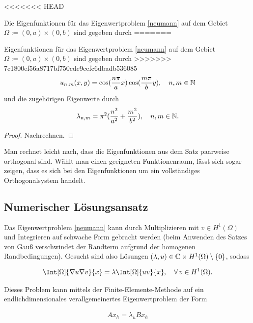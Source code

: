 \documentclass{article}
\begin{document}
<<<<<<< HEAD
\begin{theorem}\label{satz_1_2}
	Die Eigenfunktionen für das Eigenwertproblem \eqref{neumann} auf dem Gebiet $\Omega := (0,a) \times (0,b)$ sind gegeben durch
=======
\begin{theorem}
	Eigenfunktionen für das Eigenwertproblem \eqref{neumann} auf dem Gebiet $\Omega := (0,a) \times (0,b)$ sind gegeben durch
>>>>>>> 7c1800ef56a8717bf750cde9cefc6dbadb536085
	\begin{align*}
		u_{n,m}(x,y) = \cos(\frac{n \pi}{a}x)\cos(\frac{m \pi}{b}y), \quad n,m \in \mathbb{N}
	\end{align*}
	und die zugehörigen Eigenwerte durch
	\begin{align*}
		\lambda_{n,m} = \pi^2(\frac{n^2}{a^2} + \frac{m^2}{b^2}), \quad n,m \in \mathbb{N}.
	\end{align*}
\end{theorem}

\begin{proof}
	Nachrechnen.
\end{proof}

\begin{remark}
	Man rechnet leicht nach, dass die Eigenfunktionen aus dem Satz paarweise orthogonal sind. Wählt man einen geeigneten Funktionenraum, lässt sich sogar zeigen, dass es sich bei den Eigenfunktionen um ein vollständiges Orthogonalsystem handelt.
\end{remark}

\subsection{Numerischer Lösungsansatz}

Das Eigenwertproblem \ref{neumann} kann durch Multiplizieren mit $v \in H^1(\Omega)$ und Integrieren auf schwache Form gebracht werden (beim Anwenden des Satzes von Gauß verschwindet der Randterm aufgrund der homogenen Randbedingungen). Gesucht sind also Lösungen $(\lambda, u) \in \mathbb{C} \times H^1(\Omega) \setminus \{0\}$, sodass

\begin{align*}
	\Int[\Omega]{\nabla u \nabla v}{x} = \lambda \Int[\Omega]{uv}{x}, \quad \Forall v \in H^1(\Omega).
\end{align*}

Dieses Problem kann mittels der Finite-Elemente-Methode auf ein endlichdimensionales verallgemeinertes Eigenwertproblem der Form

\begin{align} \label{discretization}
	A x_h = \lambda_h B x_h
\end{align}


\end{theorem}
\end{document}
